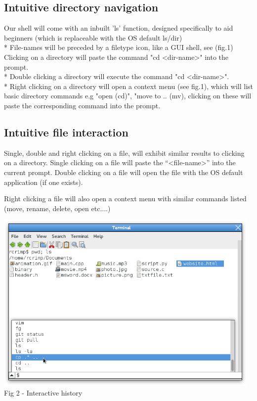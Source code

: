 \documentclass[a4paper,12pt]{article}
\begin{document}
\subsection*{Intuitive directory navigation}
Our shell will come with an inbuilt 'ls' function, designed specifically to aid beginners
(which is replaceable with the OS default ls/dir)\\*
File-names will be preceded by a filetype icon, like a GUI shell, see (fig.1)\\

Clicking on a directory will paste the command "cd \textless dir-name\textgreater" into the prompt.\\*
Double clicking a directory will execute the command "cd \textless dir-name\textgreater".\\*
Right clicking on a directory will open a context menu (see fig.1), which will list basic directory commands e.g "open (cd)", "move to .. (mv), clicking on these will paste the corresponding command into the prompt.
\subsection*{Intuitive file interaction}
Single, double and right clicking on a file, will exhibit similar results to clicking on a directory.
Single clicking on a file will paste the ``\textless file-name\textgreater'' into the current prompt.
Double clicking on a file will open the file with the OS default application (if one exists).

Right clicking a file will also  open a context menu with similar commands listed (move, rename, delete, open etc....)

\begin{center}
  \includegraphics[width=13cm]{history.png}\\
  \small Fig 2 - Interactive history
\end{center}
\end{document}
